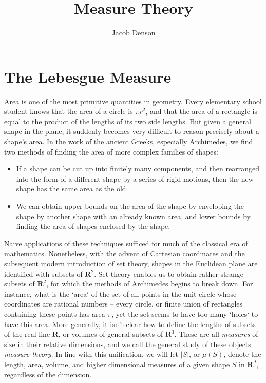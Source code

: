 

\title{Measure Theory}
\author{Jacob Denson}




\maketitle

\tableofcontents


\chapter{The Lebesgue Measure}

Area is one of the most primitive quantities in geometry. Every elementary school student knows that the area of a circle is $\pi r^2$, and that the area of a rectangle is equal to the product of the lengths of its two side lengths. But given a general shape in the plane, it suddenly becomes very difficult to reason precisely about a shape's area. In the work of the ancient Greeks, especially Archimedes, we find two methods of finding the area of more complex families of shapes:
%
\begin{itemize}
    \item If a shape can be cut up into finitely many components, and then rearranged into the form of a different shape by a series of rigid motions, then the new shape has the same area as the old.

    \item We can obtain upper bounds on the area of the shape by enveloping the shape by another shape with an already known area, and lower bounds by finding the area of shapes enclosed by the shape.
\end{itemize}
%
Naive applications of these techniques sufficed for much of the classical era of mathematics. Nonetheless, with the advent of Cartesian coordinates and the subsequent modern introduction of set theory, shapes in the Euclidean plane are identified with subsets of $\mathbf{R}^2$. Set theory enables us to obtain rather strange subsets of $\mathbf{R}^2$, for which the methods of Archimedes begins to break down. For instance, what is the `area` of the set of all points in the unit circle whose coordinates are rational numbers -- every circle, or finite union of rectangles containing these points has area $\pi$, yet the set seems to have too many `holes` to have this area. More generally, it isn't clear how to define the lengths of subsets of the real line $\mathbf{R}$, or volumes of general subsets of $\mathbf{R}^3$. These are all {\it measures} of size in their relative dimensions, and we call the general study of these objects {\it measure theory}. In line with this unification, we will let $|S|$, or $\mu(S)$, denote the length, area, volume, and higher dimensional measures of a given shape $S$ in $\mathbf{R}^d$, regardless of the dimension.

